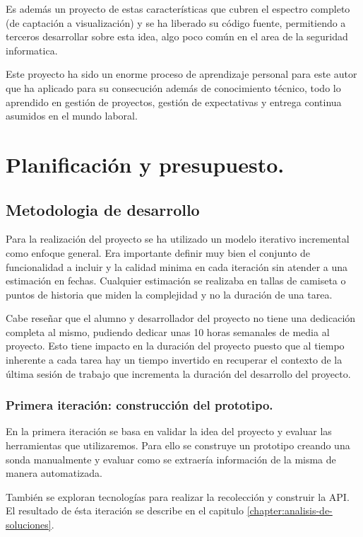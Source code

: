 Es además un proyecto de estas características que cubren el espectro completo (de captación a visualización) y se ha liberado su código fuente, permitiendo a terceros desarrollar sobre esta idea, algo
poco común en el area de la seguridad informatica. 

Este proyecto ha sido un enorme proceso de aprendizaje personal para este autor que ha aplicado para su consecución además de conocimiento técnico, todo lo aprendido
en gestión de proyectos, gestión de expectativas y entrega continua asumidos en el mundo laboral.


\chapter{Planificación y presupuesto.}
\section{Metodologia de desarrollo}

Para la realización del proyecto se ha utilizado un modelo iterativo incremental como enfoque general. Era importante definir
muy bien el conjunto de funcionalidad a incluir y la calidad minima en cada iteración sin atender a una estimación en fechas. 
Cualquier estimación se realizaba en tallas de camiseta o puntos de historia que miden la complejidad y no la duración de una tarea.

Cabe reseñar que el alumno y desarrollador del proyecto no tiene una dedicación completa al mismo, pudiendo dedicar unas 10 horas semanales
de media al proyecto. Esto tiene impacto en la duración del proyecto puesto que al tiempo inherente a cada tarea hay un tiempo
invertido en recuperar el contexto de la última sesión de trabajo que incrementa la duración del desarrollo del proyecto.


\subsection{Primera iteración: construcción del prototipo.}

En la primera iteración se basa en validar la idea del proyecto y evaluar las herramientas que utilizaremos. Para ello se construye
un prototipo creando una sonda manualmente y evaluar como se extraería información de la misma de manera automatizada.

También se exploran tecnologías para realizar la recolección y construir la API. El resultado de ésta iteración se describe en
el capitulo \ref{chapter:analisis-de-soluciones}.

